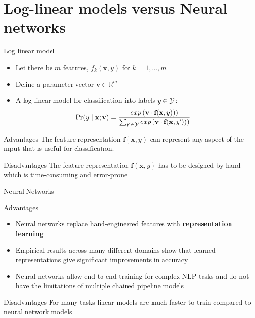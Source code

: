 




\section{Log-linear models versus Neural networks}
\frame{\tableofcontents[currentsection]}

\begin{frame}{Log linear model}
\begin{itemize}[<+->]
\item Let there be $m$ features, $f_k(\textbf{x}, y)$ for $k = 1, \ldots, m$
\item Define a parameter vector $\textbf{v} \in \mathbb{R}^m$
\item A log-linear model for classification into labels $y \in {\cal Y}$: 
\[ \Pr(y \mid \textbf{x}; \textbf{v}) = \frac{exp\left(\textbf{v} \cdot \textbf{f}(\textbf{x}, y))\right)}{\sum_{y' \in {\cal Y}} exp\left(\textbf{v} \cdot \textbf{f}(\textbf{x}, y'))\right)} \]
\end{itemize}
\pause
\begin{block}{Advantages}
The feature representation $\textbf{f}(\textbf{x}, y)$ can represent any aspect of the input that is useful for classification.
\end{block}
\pause
\begin{block}{Disadvantages}
The feature representation $\textbf{f}(\textbf{x}, y)$ has to be designed by hand which is time-consuming and error-prone.
\end{block}
\end{frame}

\begin{frame}{Neural Networks}
\begin{block}{Advantages}
\begin{itemize}[<+->]
\item Neural networks replace hand-engineered features with \textbf{representation learning}
\item Empirical results across many different domains show that learned representations give significant improvements in accuracy
\item Neural networks allow end to end training for complex NLP tasks and do not have the limitations of multiple chained pipeline models 
\end{itemize}
\end{block}
\pause
\begin{block}{Disadvantages}
For many tasks linear models are much faster to train compared to neural network models
\end{block}
\end{frame}


